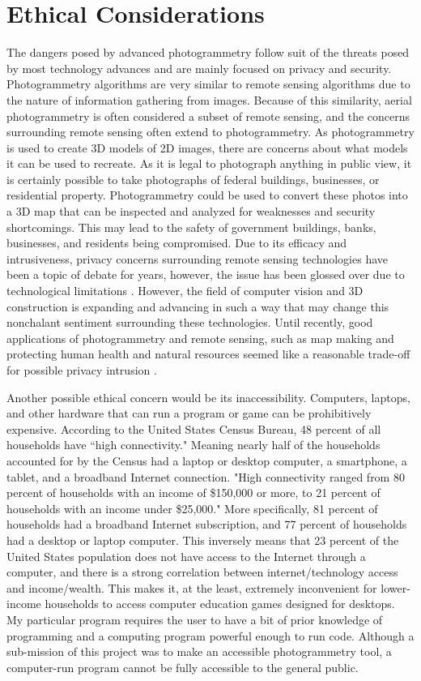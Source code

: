\documentclass[10pt,twocolumn]{article}
\begin{document}
\section{Ethical Considerations}
The dangers posed by advanced photogrammetry follow suit of the threats posed by most technology advances and are mainly focused on privacy and security. Photogrammetry algorithms are very similar to remote sensing algorithms due to the nature of information gathering from images. Because of this similarity, aerial photogrammetry is often considered a subset of remote sensing, and the concerns surrounding remote sensing often extend to photogrammetry. As photogrammetry is used to create 3D models of 2D images, there are concerns about what models it can be used to recreate. As it is legal to photograph anything in public view, it is certainly possible to take photographs of federal buildings, businesses, or residential property. Photogrammetry could be used to convert these photos into a 3D map that can be inspected and analyzed for weaknesses and security shortcomings. This may lead to the safety of government buildings, banks, businesses, and residents being compromised.
Due to its efficacy and intrusiveness, privacy concerns surrounding remote sensing technologies have been a topic of debate for years, however, the issue has been glossed over due to technological limitations \cite{slonecker1998emerging}. However, the field of computer vision and 3D construction is expanding and advancing in such a way that may change this nonchalant sentiment surrounding these technologies. Until recently, good applications of photogrammetry and remote sensing, such as map making and protecting human health and natural resources seemed like a reasonable trade-off for possible privacy intrusion \cite{slonecker1998emerging}.

Another possible ethical concern would be its inaccessibility. Computers, laptops, and other hardware that can run a program or game can be prohibitively expensive. According to the United States Census Bureau, 48 percent of all households have “high connectivity." \cite{ryan2017computer} Meaning nearly half of the households accounted for by the Census had a laptop or desktop computer, a smartphone, a tablet, and a broadband Internet connection. "High connectivity ranged from 80 percent of households with an income of \$150,000 or more, to 21 percent of households with an income under \$25,000." \cite{ryan2017computer} More specifically, 81 percent of households had a broadband Internet subscription, and 77 percent of households had a desktop or laptop computer. \cite{ryan2017computer} This inversely means that 23 percent of the United States population does not have access to the Internet through a computer, and there is a strong correlation between internet/technology access and income/wealth. This makes it, at the least, extremely inconvenient for lower-income households to access computer education games designed for desktops. 
My particular program requires the user to have a bit of prior knowledge of programming and a computing program powerful enough to run code. Although a sub-mission of this project was to make an accessible photogrammetry tool, a computer-run program cannot be fully accessible to the general public.


\printbibliography 
\end{document}
